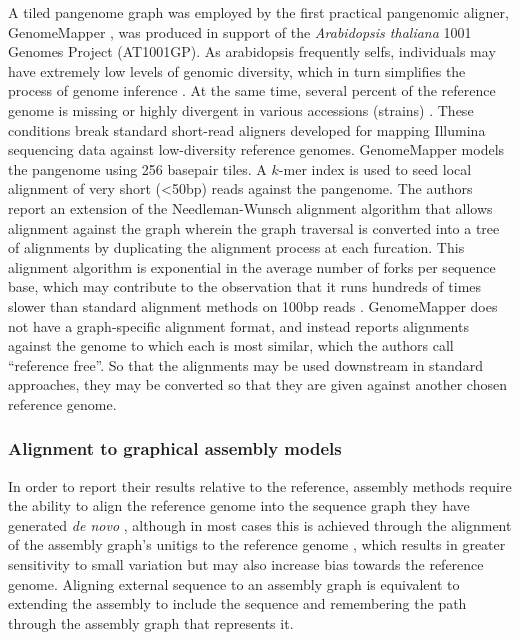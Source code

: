 A tiled pangenome graph was employed by the first practical pangenomic aligner, GenomeMapper \cite{schneeberger2009simultaneous}, was produced in support of the \emph{Arabidopsis thaliana} 1001 Genomes Project (AT1001GP).
As arabidopsis frequently selfs, individuals may have extremely low levels of genomic diversity, which in turn simplifies the process of genome inference \cite{cao2011whole}.
At the same time, several percent of the reference genome is missing or highly divergent in various accessions (strains) \cite{clark2007common,zeller2008detecting}.
These conditions break standard short-read aligners developed for mapping Illumina sequencing data against low-diversity reference genomes.
GenomeMapper models the pangenome using 256 basepair tiles.
A $k$-mer index is used to seed local alignment of very short (<50bp) reads against the pangenome.
The authors report an extension of the Needleman-Wunsch alignment algorithm that allows alignment against the graph wherein the graph traversal is converted into a tree of alignments by duplicating the alignment process at each furcation.
This alignment algorithm is exponential in the average number of forks per sequence base, which may contribute to the observation that it runs hundreds of times slower than standard alignment methods on 100bp reads \cite{liu2016debga}.
GenomeMapper does not have a graph-specific alignment format, and instead reports alignments against the genome to which each is most similar, which the authors call ``reference free''.
So that the alignments may be used downstream in standard approaches, they may be converted so that they are given against another chosen reference genome.

\subsubsection{Alignment to graphical assembly models}

In order to report their results relative to the reference, assembly methods require the ability to align the reference genome into the sequence graph they have generated \emph{de novo} \cite{iqbal2012novo,simpson2012efficient}, although in most cases this is achieved through the alignment of the assembly graph's unitigs to the reference genome \cite{li2015fermikit}, which results in greater sensitivity to small variation but may also increase bias towards the reference genome.
Aligning external sequence to an assembly graph is equivalent to extending the assembly to include the sequence and remembering the path through the assembly graph that represents it.

